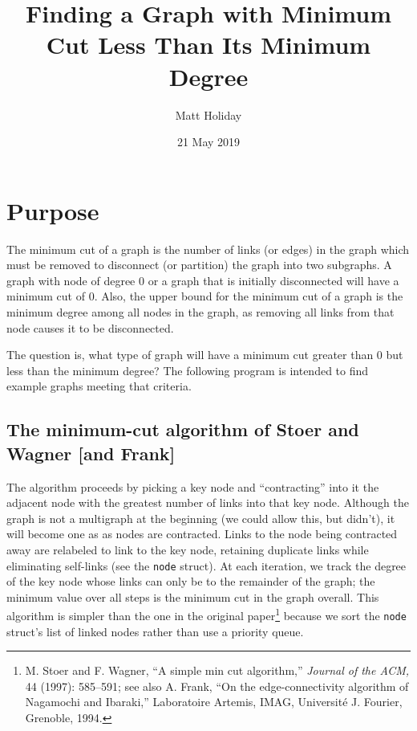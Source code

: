 \documentclass[12pt,notitlepage]{article}
\begin{document}
\title{Finding a Graph with Minimum Cut Less Than Its Minimum Degree}
\author{Matt Holiday}
\date{21 May 2019}
\maketitle
\thispagestyle{empty}

\section{Purpose}
The minimum cut of a graph is the number of links (or edges) in the graph which must be
removed to disconnect (or partition) the graph into two subgraphs. A graph with node of
degree 0 or a graph that is initially disconnected will have a minimum cut of 0. Also,
the upper bound for the minimum cut of a graph is the minimum degree among all nodes in
the graph, as removing all links from that node causes it to be disconnected.

The question is, what type of graph will have a minimum cut greater than 0 but less
than the minimum degree? The following program is intended to find example graphs
meeting that criteria.

\subsection{The minimum-cut algorithm of Stoer and Wagner [and Frank]}
The algorithm proceeds by picking a key node and ``contracting'' into it the adjacent
node with the greatest number of links into that key node. Although the graph is not
a multigraph at the beginning (we could allow this, but didn't), it will become one as
as nodes are contracted. Links to the node being contracted away are relabeled to
link to the key node, retaining duplicate links while eliminating self-links (see
the \verb|node| struct). At each iteration, we track the degree of the key node whose
links can only be to the remainder of the graph; the minimum value over all steps
is the minimum cut in the graph overall. This algorithm is simpler than the one in
the original paper\footnote
{\flushbottom M. Stoer and F. Wagner, ``A simple min cut algorithm,''
{\it Journal of the ACM,} 44 (1997): 585--591; see also A. Frank, ``On the
edge-connectivity algorithm of Nagamochi and Ibaraki,'' Laboratoire Artemis, IMAG, 
Universit\'e J. Fourier, Grenoble, 1994.}
because we sort the \verb|node| struct's list of linked nodes rather than use a priority
queue.
\end{document}
